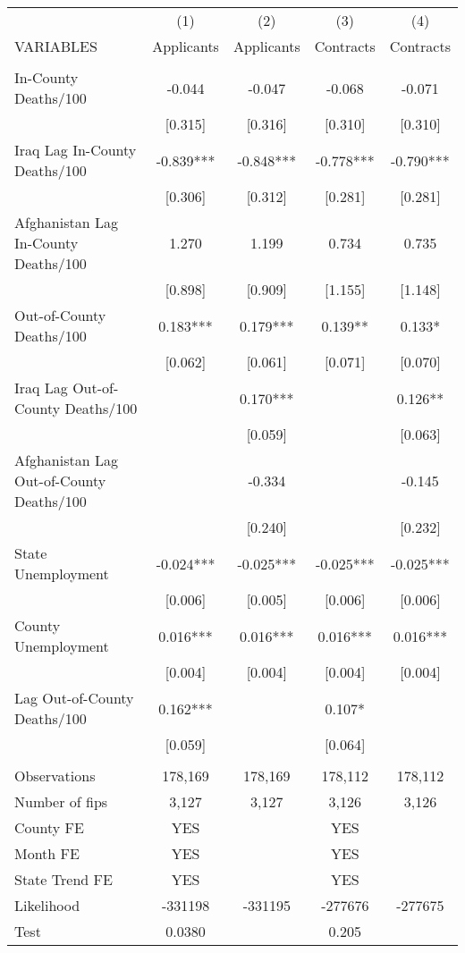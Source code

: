 \documentclass[]{article}
\begin{document}
\begin{tabular}{lcccc} \hline
 & (1) & (2) & (3) & (4) \\
VARIABLES & Applicants & Applicants & Contracts & Contracts \\ \hline
 &  &  &  &  \\
In-County Deaths/100 & -0.044 & -0.047 & -0.068 & -0.071 \\
 & [0.315] & [0.316] & [0.310] & [0.310] \\
Iraq Lag In-County Deaths/100 & -0.839*** & -0.848*** & -0.778*** & -0.790*** \\
 & [0.306] & [0.312] & [0.281] & [0.281] \\
Afghanistan Lag In-County Deaths/100 & 1.270 & 1.199 & 0.734 & 0.735 \\
 & [0.898] & [0.909] & [1.155] & [1.148] \\
Out-of-County Deaths/100 & 0.183*** & 0.179*** & 0.139** & 0.133* \\
 & [0.062] & [0.061] & [0.071] & [0.070] \\
Iraq Lag Out-of-County Deaths/100 &  & 0.170*** &  & 0.126** \\
 &  & [0.059] &  & [0.063] \\
Afghanistan Lag Out-of-County Deaths/100 &  & -0.334 &  & -0.145 \\
 &  & [0.240] &  & [0.232] \\
State Unemployment & -0.024*** & -0.025*** & -0.025*** & -0.025*** \\
 & [0.006] & [0.005] & [0.006] & [0.006] \\
County Unemployment & 0.016*** & 0.016*** & 0.016*** & 0.016*** \\
 & [0.004] & [0.004] & [0.004] & [0.004] \\
Lag Out-of-County Deaths/100 & 0.162*** &  & 0.107* &  \\
 & [0.059] &  & [0.064] &  \\
 &  &  &  &  \\
Observations & 178,169 & 178,169 & 178,112 & 178,112 \\
Number of fips & 3,127 & 3,127 & 3,126 & 3,126 \\
County FE & YES &  & YES &  \\
Month FE & YES &  & YES &  \\
State Trend FE & YES &  & YES &  \\
Likelihood & -331198 & -331195 & -277676 & -277675 \\
Test & 0.0380 &  & 0.205 &  \\

\end{tabular}
\end{document}
